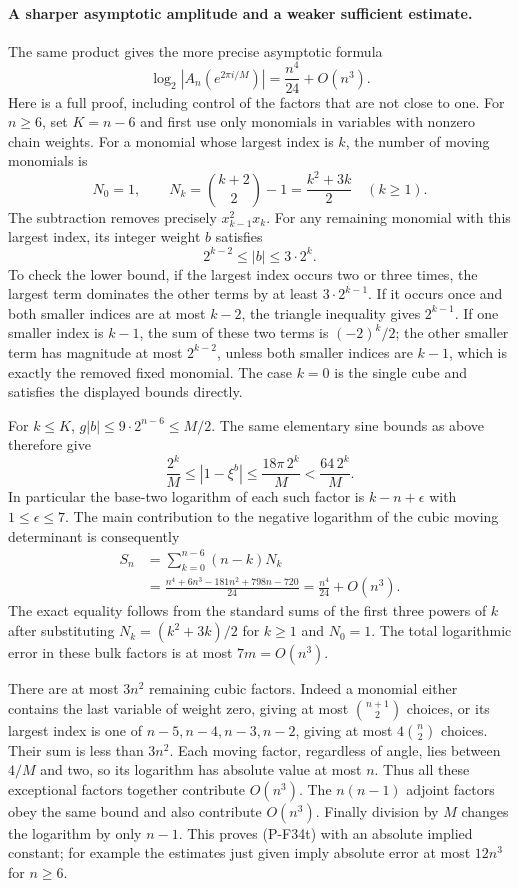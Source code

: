 \paragraph{A sharper asymptotic amplitude and a weaker sufficient estimate.}
The same product gives the more precise asymptotic formula
\[
 \log_2|A_n(e^{2\pi i/M})|=\frac{n^4}{24}+O(n^3).
 \tag{P-F34t}
\]
Here is a full proof, including control of the factors that are
not close to one. For $n\ge6$, set $K=n-6$ and first use only
monomials in variables with nonzero chain weights. For a monomial
whose largest index is $k$, the number of moving monomials is
\[
 N_0=1,\qquad N_k=\binom{k+2}{2}-1=\frac{k^2+3k}{2}
                      \quad(k\ge1).
\]
The subtraction removes precisely $x_{k-1}^2x_k$.
For any remaining monomial with this largest index, its integer
weight $b$ satisfies
\[
                       2^{k-2}\le |b|\le3\cdot2^k.
\]
To check the lower bound, if the largest index occurs two or
three times, the largest term dominates the other terms by at
least $3\cdot2^{k-1}$. If it occurs once and both smaller indices
are at most $k-2$, the triangle inequality gives $2^{k-1}$.
If one smaller index is $k-1$, the sum of these two terms is
$(-2)^k/2$; the other smaller term has magnitude at most
$2^{k-2}$, unless both smaller indices are $k-1$, which is
exactly the removed fixed monomial. The case $k=0$ is the
single cube and satisfies the displayed bounds directly.

For $k\le K$, $g|b|\le9\cdot2^{n-6}\le M/2$.
The same elementary sine bounds as above therefore give
\[
 \frac{2^k}{M}\le |1-\xi^b|
       \le\frac{18\pi\,2^k}{M}<\frac{64\,2^k}{M}.
\]
In particular the base-two logarithm of each such factor is
$k-n+\epsilon$ with $1\le\epsilon\le7$.
The main contribution to the negative logarithm of the cubic
moving determinant is consequently
\begin{align*}
 S_n&=\sum_{k=0}^{n-6}(n-k)N_k\\
    &=\frac{n^4+6n^3-181n^2+798n-720}{24}
      =\frac{n^4}{24}+O(n^3).
\end{align*}
The exact equality follows from the standard sums of the first
three powers of $k$ after substituting
$N_k=(k^2+3k)/2$ for $k\ge1$ and $N_0=1$.
The total logarithmic error in these bulk factors is at most
$7m=O(n^3)$.

There are at most $3n^2$ remaining cubic factors. Indeed a
monomial either contains the last variable of weight zero,
giving at most $\binom{n+1}{2}$ choices, or its largest index
is one of $n-5,n-4,n-3,n-2$, giving at most
$4\binom n2$ choices. Their sum is less than $3n^2$.
Each moving factor, regardless of angle, lies between $4/M$
and two, so its logarithm has absolute value at most $n$.
Thus all these exceptional factors together contribute
$O(n^3)$. The $n(n-1)$ adjoint factors obey the same bound
and also contribute $O(n^3)$. Finally division by $M$ changes
the logarithm by only $n-1$. This proves (P-F34t) with an
absolute implied constant; for example the estimates just
given imply absolute error at most $12n^3$ for $n\ge6$.

